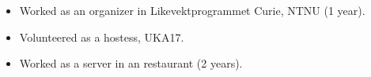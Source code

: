 \begin{itemize}
\item Worked as an organizer in Likevektprogrammet Curie, NTNU (1 year).
\item Volunteered as a hostess, UKA17.
\item Worked as a server in an restaurant (2 years).
\end{itemize}


\divider%

 \\

\divider

\clearpage